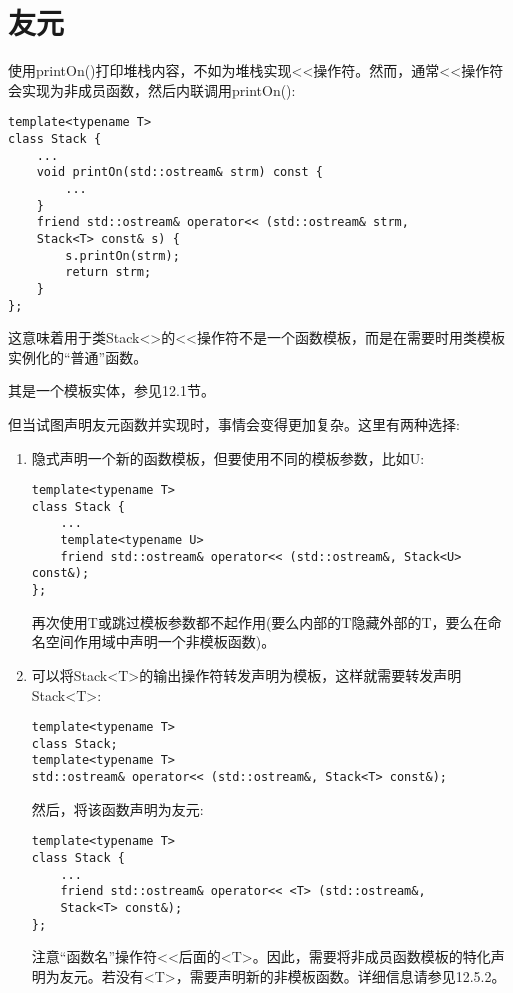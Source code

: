 \section{友元}

使用printOn()打印堆栈内容，不如为堆栈实现<{}<操作符。然而，通常<{}<操作符会实现为非成员函数，然后内联调用printOn():

\begin{lstlisting}[style=styleCXX]
template<typename T>
class Stack {
	...
	void printOn(std::ostream& strm) const {
		...
	}
	friend std::ostream& operator<< (std::ostream& strm,
	Stack<T> const& s) {
		s.printOn(strm);
		return strm;
	}
};
\end{lstlisting}

这意味着用于类Stack<>的<{}<操作符不是一个函数模板，而是在需要时用类模板实例化的“普通”函数。

\begin{tcolorbox}[colback=webgreen!5!white,colframe=webgreen!75!black]
\hspace*{0.75cm}其是一个模板实体，参见12.1节。
\end{tcolorbox}

但当试图声明友元函数并实现时，事情会变得更加复杂。这里有两种选择:

\begin{enumerate}
\item 
隐式声明一个新的函数模板，但要使用不同的模板参数，比如U:

\begin{lstlisting}[style=styleCXX]
template<typename T>
class Stack {
	...
	template<typename U>
	friend std::ostream& operator<< (std::ostream&, Stack<U> const&);
};
\end{lstlisting}

再次使用T或跳过模板参数都不起作用(要么内部的T隐藏外部的T，要么在命名空间作用域中声明一个非模板函数)。

\item 
可以将Stack<T>的输出操作符转发声明为模板，这样就需要转发声明Stack<T>:

\begin{lstlisting}[style=styleCXX]
template<typename T>
class Stack;
template<typename T>
std::ostream& operator<< (std::ostream&, Stack<T> const&);
\end{lstlisting}

然后，将该函数声明为友元:

\begin{lstlisting}[style=styleCXX]
template<typename T>
class Stack {
	...
	friend std::ostream& operator<< <T> (std::ostream&,
	Stack<T> const&);
};
\end{lstlisting}

注意“函数名”操作符<{}<后面的<T>。因此，需要将非成员函数模板的特化声明为友元。若没有<T>，需要声明新的非模板函数。详细信息请参见12.5.2。
\end{enumerate}

